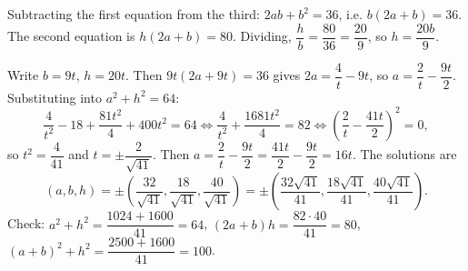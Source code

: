 Subtracting the first equation from the third: $2ab+b^2=36$, i.e. $b(2a+b)=36$. The second equation is $h(2a+b)=80$. Dividing, $\dfrac {h}{b}=\dfrac{80}{36}=\dfrac{20}{9}$, so $h=\dfrac{20b}{9}$.

Write $b=9t$, $h=20t$. Then $9t(2a+9t)=36$ gives $2a=\dfrac{4}{t}-9t$, so $a=\dfrac{2}{t}-\dfrac{9t}{2}$. Substituting into $a^2+h^2=64$:
\[
\dfrac{4}{t^2}-18+\dfrac{81t^2}{4}+400t^2=64\iff\dfrac{4}{t^2}+\dfrac{1681t^2}{4}=82\iff\left(\dfrac{2}{t}-\dfrac{41t}{2}\right)^2=0,
\]
so $t^2=\dfrac{4}{41}$ and $t=\pm\dfrac{2}{\sqrt{41}}$. Then $a=\dfrac{2}{t}-\dfrac{9t}{2}=\dfrac{41t}{2}-\dfrac{9t}{2}=16t$. The solutions are
\[
\boxed{(a,b,h)=\pm\left(\dfrac{32}{\sqrt{41}},\dfrac{18}{\sqrt{41}},\dfrac{40}{\sqrt{41}}\right)=\pm\left(\dfrac{32\sqrt{41}}{41},\dfrac{18\sqrt{41}}{41},\dfrac{40\sqrt{41}}{41}\right)}.
\]
Check: $a^2+h^2=\dfrac{1024+1600}{41}=64$, $(2a+b)h=\dfrac{82\cdot40}{41}=80$, $(a+b)^2+h^2=\dfrac{2500+1600}{41}=100$.
